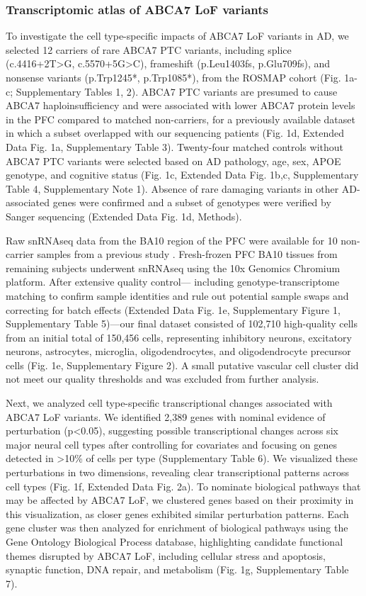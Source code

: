 \subsubsection{Transcriptomic atlas of ABCA7 LoF variants}
To investigate the cell type-specific impacts of ABCA7 LoF variants in AD, we selected 12 carriers of rare ABCA7 PTC variants, including splice (c.4416+2T>G, c.5570+5G>C), frameshift (p.Leu1403fs, p.Glu709fs), and nonsense variants (p.Trp1245*, p.Trp1085*), from the ROSMAP cohort (Fig. 1a-c; Supplementary Tables 1, 2). ABCA7 PTC variants are presumed to cause ABCA7 haploinsufficiency and were associated with lower ABCA7 protein levels in the PFC compared to matched non-carriers, for a previously available dataset in which a subset overlapped with our sequencing patients (Fig. 1d, Extended Data Fig. 1a, Supplementary Table 3). Twenty-four matched controls without ABCA7 PTC variants were selected based on AD pathology, age, sex, APOE genotype, and cognitive status (Fig. 1c, Extended Data Fig. 1b,c, Supplementary Table 4, Supplementary Note 1). Absence of rare damaging variants in other AD-associated genes\supercite{Holstege2022-vp} were confirmed and a subset of genotypes were verified by Sanger sequencing (Extended Data Fig. 1d, Methods).

Raw snRNAseq data from the BA10 region of the PFC were available for 10 non-carrier samples from a previous study \supercite{Mathys2019-wb}. Fresh-frozen PFC BA10 tissues from remaining subjects underwent snRNAseq using the 10x Genomics Chromium platform. After extensive quality control— including genotype-transcriptome matching to confirm sample identities and rule out potential sample swaps and correcting for batch effects (Extended Data Fig. 1e, Supplementary Figure 1, Supplementary Table 5)—our final dataset consisted of 102,710 high-quality cells from an initial total of 150,456 cells, representing inhibitory neurons, excitatory neurons, astrocytes, microglia, oligodendrocytes, and oligodendrocyte precursor cells (Fig. 1e, Supplementary Figure 2). A small putative vascular cell cluster did not meet our quality thresholds and was excluded from further analysis.

Next, we analyzed cell type-specific transcriptional changes associated with ABCA7 LoF variants. We identified 2,389 genes with nominal evidence of perturbation (p<0.05), suggesting possible transcriptional changes across six major neural cell types after controlling for covariates and focusing on genes detected in >10\% of cells per type (Supplementary Table 6). We visualized these perturbations in two dimensions, revealing clear transcriptional patterns across cell types (Fig. 1f, Extended Data Fig. 2a). To nominate biological pathways that may be affected by ABCA7 LoF, we clustered genes based on their proximity in this visualization, as closer genes exhibited similar perturbation patterns. Each gene cluster was then analyzed for enrichment of biological pathways using the Gene Ontology Biological Process database, highlighting candidate functional themes disrupted by ABCA7 LoF, including cellular stress and apoptosis, synaptic function, DNA repair, and metabolism (Fig. 1g, Supplementary Table 7).

